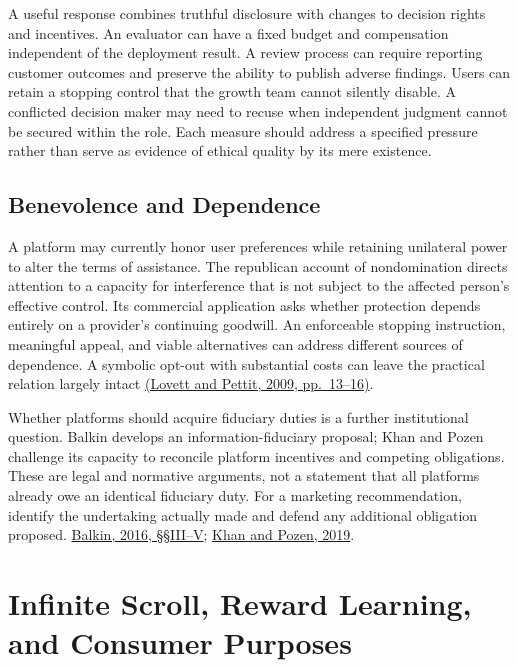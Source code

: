 A useful response combines truthful disclosure with changes to decision
rights and incentives. An evaluator can have a fixed budget and
compensation independent of the deployment result. A review process can
require reporting customer outcomes and preserve the ability to publish
adverse findings. Users can retain a stopping control that the growth
team cannot silently disable. A conflicted decision maker may need to
recuse when independent judgment cannot be secured within the role. Each
measure should address a specified pressure rather than serve as
evidence of ethical quality by its mere existence.

\hypertarget{M09-benevolence-and-dependence}{%
\subsection{Benevolence and
Dependence}\label{M09-benevolence-and-dependence}}

\noindent \noindent A platform may currently honor user preferences while
retaining unilateral power to alter the terms of assistance. The
republican account of nondomination directs attention to a capacity for
interference that is not subject to the affected person's effective
control. Its commercial application asks whether protection depends
entirely on a provider's continuing goodwill. An enforceable stopping
instruction, meaningful appeal, and viable alternatives can address
different sources of dependence. A symbolic opt-out with substantial
costs can leave the practical relation largely intact
\href{https://bpb-us-e2.wpmucdn.com/sites.wustl.edu/dist/6/3556/files/2017/02/2009.-Neorepublicanism-2bzyex8.pdf}{(Lovett
and Pettit, 2009, pp.~13--16)}.

Whether platforms should acquire fiduciary duties is a further
institutional question. Balkin develops an information-fiduciary
proposal; Khan and Pozen challenge its capacity to reconcile platform
incentives and competing obligations. These are legal and normative
arguments, not a statement that all platforms already owe an identical
fiduciary duty. For a marketing recommendation, identify the undertaking
actually made and defend any additional obligation proposed.
\href{https://lawreview.law.ucdavis.edu/sites/g/files/dgvnsk15026/files/media/documents/49-4_Balkin.pdf}{Balkin,
2016, §§III--V};
\href{https://harvardlawreview.org/wp-content/uploads/2019/12/497-541_Online.pdf}{Khan
and Pozen, 2019}.


\hypertarget{M09-infinite-scroll-reward-learning-and-consumer-purposes}{%
\section{Infinite Scroll, Reward Learning, and Consumer
Purposes}\label{M09-infinite-scroll-reward-learning-and-consumer-purposes}}

